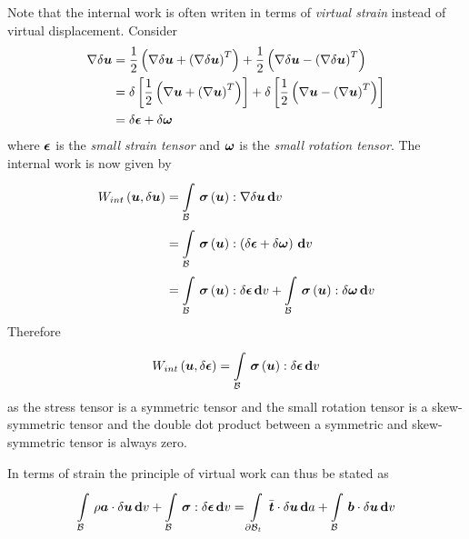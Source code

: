 Note that the internal work is often writen in terms of \emph{virtual strain}
instead of virtual displacement. Consider
\begin{equation}
  \begin{split}
    \gradient{}{\delta\vectr{u}} &= 
    \dfrac{1}{2}\pbrac{\gradient{}{\delta\vectr{u}}+\transpose{\pbrac{\gradient{}{\delta\vectr{u}}}}}+
    \dfrac{1}{2}\pbrac{\gradient{}{\delta\vectr{u}}-\transpose{\pbrac{\gradient{}{\delta\vectr{u}}}}}\\
    &=\delta\sqbrac{\dfrac{1}{2}\pbrac{\gradient{}{\vectr{u}}+\transpose{\pbrac{\gradient{}{\vectr{u}}}}}}+
    \delta\sqbrac{\dfrac{1}{2}\pbrac{\gradient{}{\vectr{u}}-\transpose{\pbrac{\gradient{}{\vectr{u}}}}}} \\
    &=\delta\tensor{\epsilon} +\delta\tensor{\omega}
  \end{split}
\end{equation}
where $\boldsymbol{\mathit{\epsilon}}$ is the \emph{small strain tensor} and
$\boldsymbol{\mathit{\omega}}$ is the \emph{small rotation tensor}. The internal work is now
given by
\begin{equation}
  \begin{split}
    \fnof{W_{int}}{\vectr{u},\delta\vectr{u}}&=
    \gint{\embedmanifold{B}}{}{\doubledotprod{\fnof{\tensor{\sigma}}{\vectr{u}}}{\gradient{}{\delta\vectr{u}}}}{v}\\
    &=\gint{\embedmanifold{B}}{}{\doubledotprod{\fnof{\tensor{\sigma}}{\vectr{u}}}{
        \pbrac{\delta\tensor{\epsilon}+\delta\tensor{\omega}}}}{v} \\
    &=\gint{\embedmanifold{B}}{}{\doubledotprod{\fnof{\tensor{\sigma}}{\vectr{u}}}{\delta\tensor{\epsilon}}}{v}+
    \gint{\embedmanifold{B}}{}{\doubledotprod{\fnof{\tensor{\sigma}}{\vectr{u}}}{\delta\tensor{\omega}}}{v}
  \end{split}
\end{equation}
Therefore
\begin{equation}
   W_{int}\left( \boldsymbol{u},\delta\boldsymbol{\mathit{\epsilon}} \right) =
    \displaystyle\int\limits_{ \mathcal{B} }^{} \, \boldsymbol{\mathit{\sigma}}\left( \boldsymbol{u} \right) :\delta\boldsymbol{\mathit{\epsilon}}\, \boldsymbol{\mathrm{d}}  v 
\end{equation}
as the stress tensor is a symmetric tensor and the small rotation tensor is a
skew-symmetric tensor and the double dot product between a symmetric and
skew-symmetric tensor is always zero.

In terms of strain the principle of virtual work can thus be stated as
\begin{equation}
  \gint{\embedmanifold{B}}{}{\dotprod{\rho\vectr{a}}{\delta\vectr{u}}}{v}+
  \gint{\embedmanifold{B}}{}{\doubledotprod{\tensor{\sigma}}{\delta\tensor{\epsilon}}}{v}=
  \gint{\boundary{\embedmanifold{B}}_{t}}{}{\dotprod{\bar{\vectr{t}}}{\delta\vectr{u}}}{a}+
  \gint{\embedmanifold{B}}{}{\dotprod{\vectr{b}}{\delta\vectr{u}}}{v}
  \label{eqn:virtualworkstrainstatment}
\end{equation}

